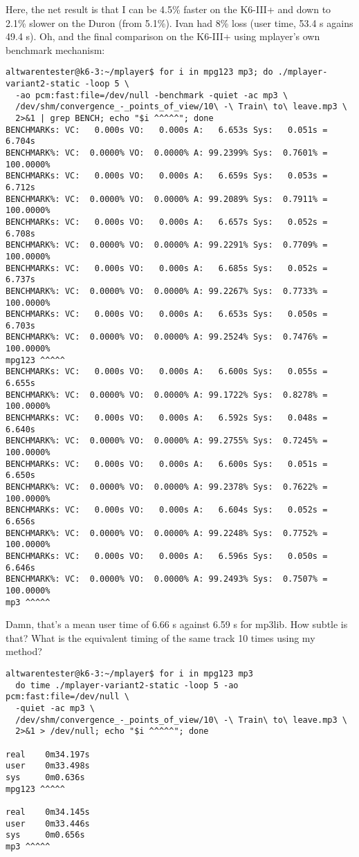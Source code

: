 \documentclass[a4paper,12pt]{scrartcl}
\begin{document}
Here, the net result is that I can be 4.5\% faster on the K6-III+ and down to 2.1\% slower on the Duron (from 5.1\%). Ivan had 8\% loss (user time, 53.4 s agains 49.4 s).
Oh, and the final comparison on the K6-III+ using mplayer's own benchmark mechanism:
\begin{verbatim}
altwarentester@k6-3:~/mplayer$ for i in mpg123 mp3; do ./mplayer-variant2-static -loop 5 \
  -ao pcm:fast:file=/dev/null -benchmark -quiet -ac mp3 \
  /dev/shm/convergence_-_points_of_view/10\ -\ Train\ to\ leave.mp3 \
  2>&1 | grep BENCH; echo "$i ^^^^^"; done
BENCHMARKs: VC:   0.000s VO:   0.000s A:   6.653s Sys:   0.051s =    6.704s
BENCHMARK%: VC:  0.0000% VO:  0.0000% A: 99.2399% Sys:  0.7601% = 100.0000%
BENCHMARKs: VC:   0.000s VO:   0.000s A:   6.659s Sys:   0.053s =    6.712s
BENCHMARK%: VC:  0.0000% VO:  0.0000% A: 99.2089% Sys:  0.7911% = 100.0000%
BENCHMARKs: VC:   0.000s VO:   0.000s A:   6.657s Sys:   0.052s =    6.708s
BENCHMARK%: VC:  0.0000% VO:  0.0000% A: 99.2291% Sys:  0.7709% = 100.0000%
BENCHMARKs: VC:   0.000s VO:   0.000s A:   6.685s Sys:   0.052s =    6.737s
BENCHMARK%: VC:  0.0000% VO:  0.0000% A: 99.2267% Sys:  0.7733% = 100.0000%
BENCHMARKs: VC:   0.000s VO:   0.000s A:   6.653s Sys:   0.050s =    6.703s
BENCHMARK%: VC:  0.0000% VO:  0.0000% A: 99.2524% Sys:  0.7476% = 100.0000%
mpg123 ^^^^^
BENCHMARKs: VC:   0.000s VO:   0.000s A:   6.600s Sys:   0.055s =    6.655s
BENCHMARK%: VC:  0.0000% VO:  0.0000% A: 99.1722% Sys:  0.8278% = 100.0000%
BENCHMARKs: VC:   0.000s VO:   0.000s A:   6.592s Sys:   0.048s =    6.640s
BENCHMARK%: VC:  0.0000% VO:  0.0000% A: 99.2755% Sys:  0.7245% = 100.0000%
BENCHMARKs: VC:   0.000s VO:   0.000s A:   6.600s Sys:   0.051s =    6.650s
BENCHMARK%: VC:  0.0000% VO:  0.0000% A: 99.2378% Sys:  0.7622% = 100.0000%
BENCHMARKs: VC:   0.000s VO:   0.000s A:   6.604s Sys:   0.052s =    6.656s
BENCHMARK%: VC:  0.0000% VO:  0.0000% A: 99.2248% Sys:  0.7752% = 100.0000%
BENCHMARKs: VC:   0.000s VO:   0.000s A:   6.596s Sys:   0.050s =    6.646s
BENCHMARK%: VC:  0.0000% VO:  0.0000% A: 99.2493% Sys:  0.7507% = 100.0000%
mp3 ^^^^^
\end{verbatim}
Damn, that's a mean user time of 6.66 s against 6.59 s for mp3lib. How subtle is that?
What is the equivalent timing of the same track 10 times using my method?
\begin{verbatim}
altwarentester@k6-3:~/mplayer$ for i in mpg123 mp3
  do time ./mplayer-variant2-static -loop 5 -ao pcm:fast:file=/dev/null \
  -quiet -ac mp3 \
  /dev/shm/convergence_-_points_of_view/10\ -\ Train\ to\ leave.mp3 \
  2>&1 > /dev/null; echo "$i ^^^^^"; done

real    0m34.197s
user    0m33.498s
sys     0m0.636s
mpg123 ^^^^^

real    0m34.145s
user    0m33.446s
sys     0m0.656s
mp3 ^^^^^
\end{verbatim}
\end{document}
